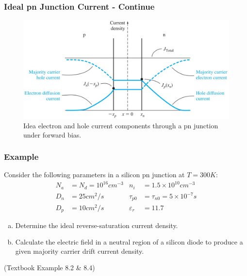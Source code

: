 \documentclass{beamer}
\begin{document}
    \begin{frame} \frametitle{Ideal pn Junction Current - Continue}
        \begin{figure}[H]
            \centering
            \includegraphics[width=0.9\linewidth]{Ideal-current-components.jpg}
            \caption{Idea electron and hole current components through a pn junction under forward bias.}
            \label{fig:Ideal-current-components.jpg}
        \end{figure}
    \end{frame}

    \begin{frame} \frametitle{Example}
        \par Consider the following parameters in a silicon pn junction at $T = 300K$:
        \begin{equation*}
            \begin{aligned}
                N_a &= N_d = 10^{16} cm^{-3} & n_i &= 1.5 \times 10^{10}  cm^{-3}  \\
                D_n &= 25 cm^{2} /s & \tau_{p0} &= \tau_{n0} = 5 \times 10^{-7} s \\
                D_p &= 10cm^2 / s &  \varepsilon_r &= 11.7 
            \end{aligned}
        \end{equation*}
        \begin{enumerate}[a)]
            \item Determine the ideal reverse-saturation current density.
            \item Calculate the electric field in a neutral region of a silicon diode to produce a given majority carrier drift current density.
        \end{enumerate}
        (Textbook Example 8.2 \& 8.4)
    \end{frame}
    
\end{document}
